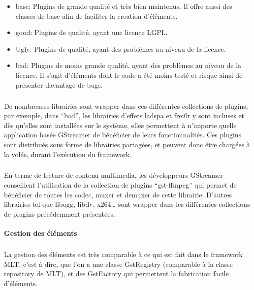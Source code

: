\begin{itemize}

  \item {base: Plugins de grande qualité et très bien maintenus. Il
  offre aussi
    des classes de base afin de faciliter la creation d'éléments.}

  \item {good: Plugins de qualité, ayant une licence LGPL}.

  \item {Ugly: Plugins de qualité, ayant des problèmes au niveau de
  la licence.}

  \item {bad: Plugins de moins grande qualité, ayant des problèmes
  au niveau
    de la licence. Il s'agit d'éléments dont le code a été moins
    testé et risque ainsi de présenter davantage de bugs.}

\end{itemize}

\subparagraph{}

De nombreuses librairies sont wrapper dans ces différentes collections
de plugins, par exemple, dans ``bad'', les librairies d'effets ladspa et
frei0r y sont incluses et dès qu'elles sont installées sur le système,
elles permettent à n'importe quelle application basée GStreamer de
bénéficier de leurs fonctionnalités.  Ces plugins sont distribués
sous forme de librairies partagées, et peuvent donc être chargées à
la volée, durant l'exécution du framework.

\subparagraph{}

En terme de lecture de contenu multimedia, les développeurs GStreamer
conseillent l'utilisation de la collection de plugins ``gst-ffmpeg''
qui permet de bénéficier de toutes les codec, muxer et demuxer de
cette librairie. D'autres librairies tel que libogg, libdv, x264\ldots
sont wrapper dans les différentes collections de plugins précédemment
présentées.

\paragraph{Gestion des éléments}

\subparagraph{}

La gestion des éléments est très comparable à ce qui est fait dans le
framework MLT, c'est à dire, que l'on a une classe GstRegistry
(comparable à la classe repository de MLT), et des GstFactory
qui permettent la fabrication facile d'éléments.

